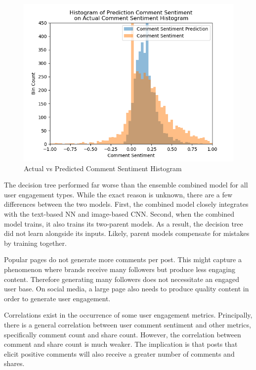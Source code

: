\documentclass[mksc,blindrev]{informs3} %
\begin{document}
\begin{figure}
\centering
\includegraphics[width=\columnwidth]{images/Sentiment_Prediction_vs_Actual.png}
\caption{Actual vs Predicted Comment Sentiment Histogram}
\label{comment_sentiment_histogram}
\end{figure}

The decision tree performed far worse than the ensemble combined model for all user engagement types. While the exact reason is unknown, there are a few differences between the two models. First, the combined model closely integrates with the text-based NN and image-based CNN. Second, when the combined model trains, it also trains its two-parent models. As a result, the decision tree did not learn alongside its inputs. Likely, parent models compensate for mistakes by training together.

Popular pages do not generate more comments per post. This might capture a phenomenon where brands receive many followers but produce less engaging content. Therefore generating many followers does not necessitate an engaged user base. On social media, a large page also needs to produce quality content in order to generate user engagement.

Correlations exist in the occurrence of some user engagement metrics. Principally, there is a general correlation between user comment sentiment and other metrics, specifically comment count and share count. However, the correlation between comment and share count is much weaker. The implication is that posts that elicit positive comments will also receive a greater number of comments and shares. 
\end{document}
